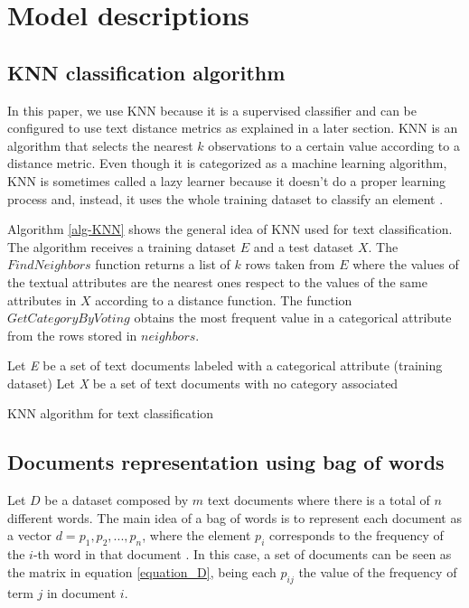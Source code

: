 \documentclass[preprint,12pt,3p]{elsarticle}
\begin{document}
\section{Model descriptions}
\label{model_descriptions}

\subsection{KNN classification algorithm}

In this paper, we use KNN because it is a supervised classifier and can be configured to use text distance metrics as explained in a later section. KNN is an algorithm that selects the nearest ${k}$ observations to a certain value according to a distance metric. Even though it is categorized as a machine learning algorithm, KNN is sometimes called a lazy learner because it doesn't do a proper learning process and, instead, it uses the whole training dataset to classify an element \cite{mavai2014survey}.\par

Algorithm \ref{alg-KNN} shows the general idea of KNN used for text classification. The algorithm receives a training dataset $E$ and a test dataset $X$. The $FindNeighbors$ function returns a list of $k$ rows taken from $E$ where the values of the textual attributes are the nearest ones respect to the values of the same attributes in $X$ according to a distance function. The function $GetCategoryByVoting$ obtains the most frequent value in a categorical attribute from the rows stored in $neighbors$.\par

\begin{algorithm}
\label{alg-KNN}
Let \textit{E} be a set of text documents labeled with a categorical attribute (training dataset)\;
Let \textit{X} be a set of text documents with no category associated\;
\caption{KNN algorithm for text classification}
\end{algorithm}

\subsection{Documents representation using bag of words}

Let $D$ be a dataset composed by $m$ text documents where there is a total of $n$ different words. The main idea of a bag of words is to represent each document as a vector ${d=p_1,p_2,...,p_n}$, where the element $p_i$ corresponds to the frequency of the $i$-th word in that document \cite{srivastava2009text}. In this case, a set of documents can be seen as the matrix in equation \ref{equation_D}, being each ${p_{ij}}$ the value of the frequency of term $j$ in document $i$.
\end{document}
